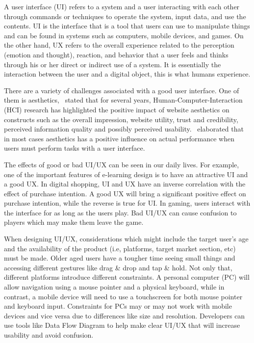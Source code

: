 \documentclass[conference]{IEEEtran}
\begin{document}
A user interface (UI) refers to a system and a user interacting with each other through commands or techniques to operate the system, input data, and use the contents\cite{Jooh}. UI is the interface that is a tool that users can use to manipulate things\cite{Roth2017UserIA} and can be found in systems such as computers, mobile devices, and games\cite{Jooh}. On the other hand, UX refers to the overall experience related to the perception (emotion and thought), reaction, and behavior that a user feels and thinks through his or her direct or indirect use of a system\cite{Jooh}. It is essentially the interaction between the user and a digital object, this is what humans experience\cite{Roth2017UserIA}.

There are a variety of challenges associated with a good user interface. One of them is aesthetics,~\cite{GlenaH} stated that for several years, Human-Computer-Interaction (HCI) research has highlighted the positive impact of website aesthetics on constructs such as the overall impression, website utility, trust and credibility, perceived information quality and possibly perceived usability.~\cite{SchmidtWolff+2018+41+55} elaborated that in most cases aesthetics has a positive influence on actual performance when users must perform tasks with a user interface.

The effects of good or bad UI/UX can be seen in our daily lives. For example, one of the important features of e-learning design is to have an attractive UI and a good UX\cite{Handayani2020GamifiedLP}. In digital shopping, UI and UX have an inverse correlation with the effect of purchase intention\cite{Watulingas}. A good UX will bring a significant positive effect on purchase intention, while the reverse is true for UI\cite{Watulingas}. In gaming, users interact with the interface for as long as the users play. Bad UI/UX can cause confusion to players which may make them leave the game\cite{Kurniawan2021UIUXMG}.

When designing UI/UX, considerations which might include the target user's age and the availability of the product (i.e, platforms, target market section, etc) must be made. Older aged users have a tougher time seeing small things and accessing different gestures like drag \& drop and tap \& hold\cite{Salman2018UsabilityEO}. Not only that, different platforms introduce different constraints. A personal computer (PC) will allow navigation using a mouse pointer and a physical keyboard, while in contrast, a mobile device will need to use a touchscreen for both mouse pointer and keyboard input. Constraints for PCs may or may not work with mobile devices and vice versa due to differences like size and resolution\cite{Garca2017ValidationON}. Developers can use tools like Data Flow Diagram to help make clear UI/UX that will increase usability and avoid confusion\cite{Wulandari2017DesignDF}.
\end{document}
